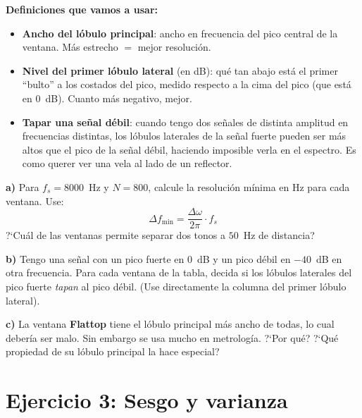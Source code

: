 \documentclass[11pt, a4paper]{article}
\begin{document}
\begin{defbox}
\textbf{Definiciones que vamos a usar:}
\begin{itemize}[noitemsep]
  \item \textbf{Ancho del l\'obulo principal}: ancho en frecuencia del pico
    central de la ventana. M\'as estrecho $=$ mejor resoluci\'on.
  \item \textbf{Nivel del primer l\'obulo lateral} (en dB): qu\'e tan abajo
    est\'a el primer ``bulto'' a los costados del pico, medido respecto a la
    cima del pico (que est\'a en 0~dB). Cuanto m\'as negativo, mejor.
  \item \textbf{Tapar una se\~nal d\'ebil}: cuando tengo dos se\~nales de
    distinta amplitud en frecuencias distintas, los l\'obulos laterales
    de la se\~nal fuerte pueden ser m\'as altos que el pico de la se\~nal
    d\'ebil, haciendo imposible verla en el espectro.
    Es como querer ver una vela al lado de un reflector.
\end{itemize}
\end{defbox}

\begin{enun}
\textbf{a)} Para $f_s = 8000$~Hz y $N = 800$, calcule la resoluci\'on
m\'inima en Hz para cada ventana. Use:
\[
  \Delta f_{\min} = \frac{\Delta\omega}{2\pi} \cdot f_s
\]
?`Cu\'al de las ventanas permite separar dos tonos a $50$~Hz de distancia?

\textbf{b)} Tengo una se\~nal con un pico fuerte en $0$~dB y un pico d\'ebil
en $-40$~dB en otra frecuencia. Para cada ventana de la tabla, decida si los
l\'obulos laterales del pico fuerte \emph{tapan} al pico d\'ebil.
(Use directamente la columna del primer l\'obulo lateral).

\textbf{c)} La ventana \textbf{Flattop} tiene el l\'obulo principal m\'as ancho
de todas, lo cual deber\'ia ser malo. Sin embargo se usa mucho en metrolog\'ia.
?`Por qu\'e? ?`Qu\'e propiedad de su l\'obulo principal la hace especial?
\end{enun}

\section*{Ejercicio 3: Sesgo y varianza}
\end{document}
